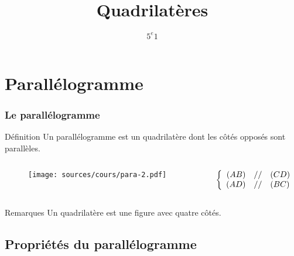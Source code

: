 \documentclass{beamer}
\title{Quadrilatères}
\author{$5^{e}1$}
\begin{document}
\frame{\titlepage}

\section{Parallélogramme}

\begin{frame}
  \frametitle{Le parallélogramme}
  \begin{alertblock}{Définition}	
    Un parallélogramme est un quadrilatère dont les côtés opposés sont parallèles. 

    \begin{columns}[t]
      \begin{column}{6cm}
        \begin{figure}[H]
          \centering
          \texttt{[image: sources/cours/para-2.pdf]}
        \end{figure}
      \end{column}
      \begin{column}{4cm}
        \vspace{1cm}
        \[
        \left \{
        \begin{array}{r c l}
          (AB) & \slash \slash & (CD) \\
          (AD) & \slash \slash & (BC)\\
        \end{array}
        \right .
        \]
      \end{column}
    \end{columns} 
  \end{alertblock}

  \begin{exampleblock}{Remarques}
    Un quadrilatère est une figure avec quatre côtés.
  \end{exampleblock}

\end{frame}

\subsection{Propriétés du parallélogramme}
\end{document}
